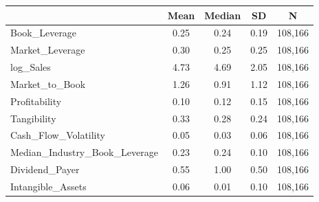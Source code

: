 {
\def\sym#1{\ifmmode^{#1}\else\(^{#1}\)\fi}
\begin{tabular}{l*{1}{cccc}}
\hline\hline
                    &        Mean&      Median&          SD&           N\\
\hline
Book\_Leverage       &        0.25&        0.24&        0.19&     108,166\\
Market\_Leverage     &        0.30&        0.25&        0.25&     108,166\\
log\_Sales           &        4.73&        4.69&        2.05&     108,166\\
Market\_to\_Book      &        1.26&        0.91&        1.12&     108,166\\
Profitability       &        0.10&        0.12&        0.15&     108,166\\
Tangibility         &        0.33&        0.28&        0.24&     108,166\\
Cash\_Flow\_Volatility&        0.05&        0.03&        0.06&     108,166\\
Median\_Industry\_Book\_Leverage&        0.23&        0.24&        0.10&     108,166\\
Dividend\_Payer      &        0.55&        1.00&        0.50&     108,166\\
Intangible\_Assets   &        0.06&        0.01&        0.10&     108,166\\
\hline\hline
\end{tabular}
}
